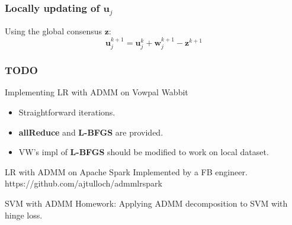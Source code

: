 \documentclass{beamer}
\begin{document}
\begin{frame}
\frametitle{Locally updating of $\mathbf{u}_j$}
Using the global consensus $\mathbf{z}$:
$$\mathbf{u}_j^{k+1} = \mathbf{u}_j^k + \mathbf{w}_j^{k+1} - \mathbf{z}^{k+1}$$
\end{frame}

\begin{frame}
\frametitle{TODO}
\begin{block}{Implementing LR with ADMM on Vowpal Wabbit}
\begin{itemize}
\item Straightforward iterations.
\item \textbf{allReduce} and \textbf{L-BFGS} are provided.
\item VW's impl of \textbf{L-BFGS} should be modified to work on local dataset.
\end{itemize}
\end{block}
\begin{block}{LR with ADMM on Apache Spark}
Implemented by a FB engineer. https://github.com/ajtulloch/admmlrspark
\end{block}
\begin{block}{SVM with ADMM}
Homework: Applying ADMM decomposition to SVM with hinge loss.
\end{block}
\end{frame}
\end{document}
